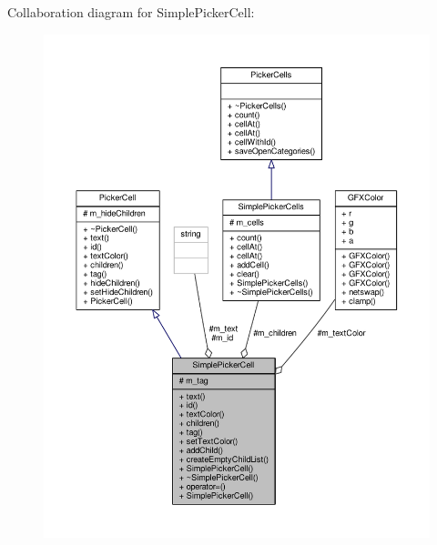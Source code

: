 Collaboration diagram for Simple\+Picker\+Cell\+:
\nopagebreak
\begin{figure}[H]
\begin{center}
\leavevmode
\includegraphics[width=350pt]{d4/d97/classSimplePickerCell__coll__graph}
\end{center}
\end{figure}
